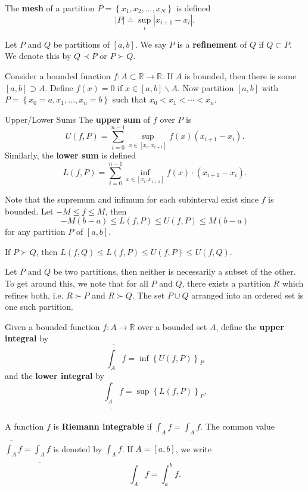 \documentclass[10pt]{report}
\begin{document}
\begin{defn}[]
The \textbf{mesh} of a partition $P =\left\{ x_1,x_2,\dots,x_N \right\}$ is defined
\[
	|P| \doteq \sup_i |x_{i+1}-x_i|.
\] 
\end{defn}

\begin{defn}[]
	Let $P$ and $Q$ be partitions of $[a,b]$. We say $P$ is a \textbf{refinement} of $Q$ if $Q \subset P$. We denote this by $Q \prec P$ or $P \succ Q$.
\end{defn}

Consider a bounded function $f:A \subset \mathbb{R}\to\mathbb{R}$. If $A$ is bounded, then there is some $[a,b]\supset A$. Define $f(x)=0$ if $x \in [a,b]\backslash A$. Now partition $[a,b]$ with $P=\left\{ x_0=a,x_1,\dots,x_n=b \right\}$ such that $x_0<x_1<\cdots<x_n$.

\begin{defn}{Upper/Lower Sums}{}
	The \textbf{upper sum} of $f$ over $P$ is
	\[
		U(f,P) = \sum_{i=0}^{n-1} \sup_{x\in[x_i,x_{i+1}]} f(x) (x_{i+1}-x_i).
	\] 
	Similarly, the \textbf{lower sum} is defined
	\[
		L(f,P) = \sum_{i=0}^{n-1} \inf_{x\in[x_i,x_{i+1}]} f(x) \cdot (x_{i+1}-x_i).
	\] 
\end{defn}

Note that the supremum and infimum for each subinterval exist since $f$ is bounded. Let $-M \leq f \leq M$, then
\[
	-M(b-a) \leq L(f,P) \leq U(f,P) \leq M(b-a)
\] for any partition $P$ of $[a,b]$.

\begin{prop}
	If $P \succ Q$, then $L(f,Q) \leq L(f,P) \leq U(f,P) \leq U(f,Q)$.
\end{prop}

Let $P$ and $Q$ be two partitions, then neither is necessarily a subset of the other. To get around this, we note that for all $P$ and $Q$, there exists a partition $R$ which refines both, i.e. $R \succ P$ and $R \succ Q$. The set $P \cup Q$ arranged into an ordered set is one such partition.

\pagebreak

\begin{defn}[]
Given a bounded function $f:A \to \mathbb{R}$ over a bounded set $A$, define the \textbf{upper integral} by
\[
	\overline{\int_{A} } f = \inf\left\{ U(f,P) \right\}_P
\] 
and the \textbf{lower integral} by
\[
	\underline{\int_{A} } f = \sup \left\{ L(f,P) \right\}_P.
\] 
\end{defn}

\begin{defn}[]
	A function $f$ is \textbf{Riemann integrable} if $\overline{\int_{A} } f = \underline{\int_{A} } f$. The common value $\overline{\int_{A} } f = \underline{\int_{A} } f$ is denoted by $\int_{A} f$. If $A=[a,b]$, we write
	\[ 
	\int_{A} f = \int_{a}^{b} f.
	\] 
\end{defn}
\end{document}
